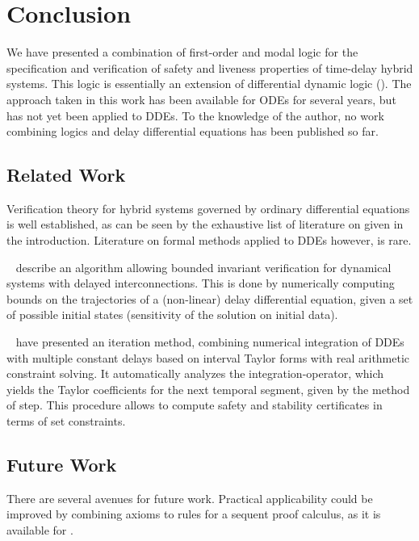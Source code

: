 \chapter{Conclusion}
    \label{ch:conclusion}

    We have presented a combination of first-order and modal logic for the specification and verification of safety and liveness properties of time-delay hybrid systems.
    This logic is essentially an extension of differential dynamic logic (\dL).
    The approach taken in this work has been available for ODEs for several years, but has not yet been applied to DDEs.
    To the knowledge of the author, no work combining logics and delay differential equations has been published so far.

    \section{Related Work}
        Verification theory for hybrid systems governed by ordinary differential equations is well established, as can be seen by the exhaustive list of literature on \dL given in the introduction.
        Literature on formal methods applied to DDEs however, is rare.

        \citeauthor*{Huang16BoundedVerificationNNDS}~\cite{Huang16BoundedVerificationNNDS} describe an algorithm allowing bounded invariant verification for dynamical systems with delayed interconnections.
        This is done by numerically computing bounds on the trajectories of a (non-linear) delay differential equation, given a set of possible initial states (sensitivity of the solution on initial data).

        \citeauthor{Zou15AutomaticVerifDDEs}~\cite{Zou15AutomaticVerifDDEs} have presented an iteration method, combining numerical integration of DDEs with multiple constant delays based on interval Taylor forms
        with real arithmetic constraint solving.
        It automatically analyzes the integration-operator, which yields the Taylor coefficients for the next temporal segment, given by the method of step.
        This procedure allows to compute safety and stability certificates in terms of set constraints.

    \section{Future Work}
        There are several avenues for future work. Practical applicability could be improved by combining axioms to rules for a sequent proof calculus, as it is available for \dL.

